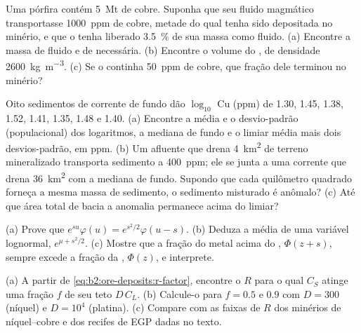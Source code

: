 \begin{exercise}[$\star\star$]\label{exo:b2:ore-deposits:8}
Uma  pórfira contém \qty{5}{Mt} de cobre. Suponha que seu fluido magmático transportasse \qty{1000}{ppm}
de cobre, metade do qual tenha sido depositada no minério, e que o  tenha liberado \qty{3.5}{\percent}
de sua massa como fluido. (a) Encontre a massa de fluido e de  necessária. (b) Encontre o volume do
, de densidade \qty{2600}{kg.m^{-3}}. (c) Se o  continha \qty{50}{ppm} de cobre, que fração
dele terminou no minério?
\end{exercise}

\begin{exercise}[$\star\star$]\label{exo:b2:ore-deposits:9}
Oito sedimentos de corrente de fundo dão $\log_{10}$ Cu (ppm) de 1.30, 1.45, 1.38, 1.52, 1.41, 1.35,
1.48 e 1.40. (a) Encontre a média e o desvio-padrão (populacional) dos logaritmos, a
mediana de fundo e o limiar média mais dois desvios-padrão, em ppm. (b) Um afluente
que drena \qty{4}{km^2} de terreno mineralizado transporta sedimento a \qty{400}{ppm}; ele se junta a uma corrente que
drena \qty{36}{km^2} com a mediana de fundo. Supondo que cada quilômetro quadrado forneça a mesma
massa de sedimento, o sedimento misturado é anômalo? (c) Até que área total de bacia a
anomalia permanece acima do limiar?
\end{exercise}

\begin{exercise}[$\star\star\star$]\label{exo:b2:ore-deposits:10}
(a) Prove que $e^{su}\varphi(u) = e^{s^2/2}\varphi(u - s)$. (b) Deduza a média de uma variável
lognormal, $e^{\mu + s^2/2}$. (c) Mostre que a fração do metal acima do ,
$\Phi(z + s)$, sempre excede a fração da , $\Phi(z)$, e interprete.
\end{exercise}

\begin{exercise}[$\star\star\star$]\label{exo:b2:ore-deposits:11}
(a) A partir de \eqref{eq:b2:ore-deposits:r-factor}, encontre o $R$ para o qual $C_S$ atinge uma fração $f$
de seu teto $D\,C_L$. (b) Calcule-o para $f = 0.5$ e $0.9$ com $D = 300$ (níquel) e $D =
10^4$ (platina). (c) Compare com as faixas de $R$ dos minérios de níquel--cobre e dos recifes de EGP dadas
no texto.
\end{exercise}

